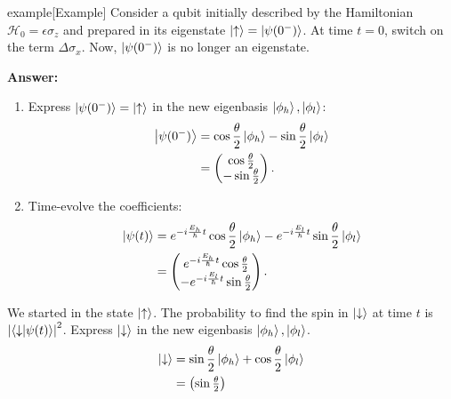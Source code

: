 \documentclass{article}
\begin{document}
\begin{callout}{example}[Example]
\label{example:s7-e1}
Consider a qubit initially described by the Hamiltonian $\mathcal{H}_0=\epsilon \sigma _z$ and prepared in its eigenstate $\ket{\uparrow}=\ket{\psi (0^-)}$. At time $t=0$, switch on the term $\Delta \sigma _x$. Now, $\ket{\psi (0^-)}$ is no longer an eigenstate.

\textbf{Answer:}
\begin{enumerate}
    \item Express $\ket{\psi (0^-)}=\ket{\uparrow}$ in the new eigenbasis $\ket{\phi _h},\ket{\phi _l}$:
        \begin{align*}
            \ket{\psi (0^-)} &= \cos \frac{\theta }{2}\ket{\phi _h}-\sin \frac{\theta }{2}\ket{\phi _l} \\
                             &=\begin{pmatrix}
                                 \cos \frac{\theta }{2} \\
                                 -\sin \frac{\theta }{2}
                             \end{pmatrix}.
        \end{align*}
    \item Time-evolve the coefficients:
        \begin{align*}
            \ket{\psi (t)} &= e^{-i \frac{E_h}{\hbar}t}\cos \frac{\theta }{2}\ket{\phi _h}-e^{-i \frac{E_l}{\hbar}t}\sin \frac{\theta }{2}\ket{\phi _l} \\
                           &=\begin{pmatrix}
                               e^{-i \frac{E_h}{\hbar}t}\cos \frac{\theta }{2}\\
                               -e^{-i \frac{E_l}{\hbar}t}\sin \frac{\theta }{2}
                           \end{pmatrix}.
        \end{align*}
\end{enumerate}
We started in the state $\ket{\uparrow}$. The probability to find the spin in $\ket{\downarrow}$ at time $t$ is $\left|  \braket{\downarrow}{\psi (t)} \right|^2$. Express $\ket{\downarrow}$ in the new eigenbasis $\ket{\phi _h},\ket{\phi _l}$.
\begin{align*}
    \ket{\downarrow} &= \sin \frac{\theta }{2}\ket{\phi _h}+\cos \frac{\theta }{2}\ket{\phi _l} \\
                     &=\begin{pmatrix}
                         \sin \frac{\theta }{2} \\

\end{pmatrix}
\end{align*}
\end{callout}
\end{document}
